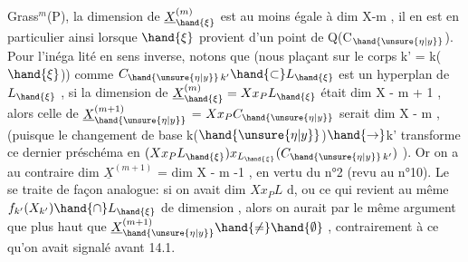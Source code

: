 
Grass$^{m}$(P), la dimension de $\underline{X}^{(m)}_{\hand{\xi}}$ est au moins égale à dim X-m , il en est
en particulier ainsi lorsque $\hand{\xi}$ provient d'un point de Q(C$_{\hand{\unsure{\eta|y}}}$). Pour l'inéga
lité en sens inverse, notons que (nous plaçant sur le corps k' = k($\hand{\xi}$))
comme $C_{\hand{\unsure{\eta|y}}\,k'} \hand{\subset} L_{\hand{\xi}}$ est  un hyperplan de $L_{\hand{\xi}}$ , si la dimension de
$\underline{X}^{(m)}_{\hand{\xi}} = Xx_{P}L_{\hand{\xi}}$ était \hand{$\geqslant$} dim X - m + 1 , alors celle de $\underline{X}^{(m+1)}_{\hand{\unsure{\eta|y}}}$ =
$Xx_{P}C_{\hand{\unsure{\eta|y}}}$ serait \hand{$\geqslant$} dim X - m , (puisque le changement de base k($\hand{\unsure{\eta|y}}$)$\hand{\to}$k'
transforme ce dernier préschéma en $(Xx_{P}L_{\hand{\xi}})x_{L_{\hand{\xi}}}(C_{\hand{\unsure{\eta|y}}\,k'})$ ). Or on a au
contraire  dim $\underline{X}^{(m+1)}$ = dim X - m -1 
, en vertu du n°2 (revu au n°10).
Le   se traite
de façon analogue: si on avait dim $Xx_{P}L$ \hand{$\geqslant$} d,  ou
ce qui revient au même  $f_{k'}(X_{k'}) \hand{\cap} L_{\hand{\xi}}$ de dimension \hand{$\geqslant$},
alors on aurait par le même argument que plus  haut que
$\underline{X}^{(m+1)}_{\hand{\unsure{\eta|y}}} \hand{\neq} \hand{\emptyset}$ , contrairement à ce qu'on avait signalé avant 14.1.

